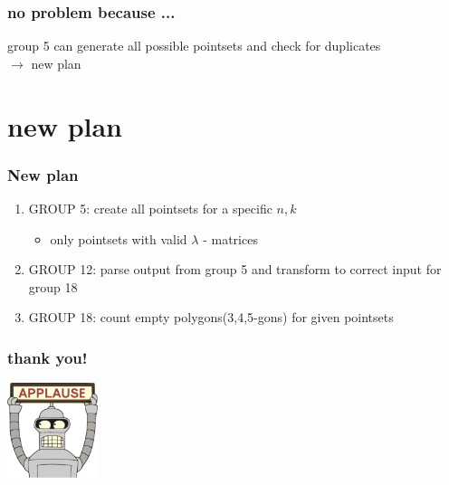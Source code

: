 \documentclass{beamer}
\begin{document}
\begin{frame}
\frametitle{no problem because ...}
group 5 can generate all possible pointsets and check for duplicates\\
$\rightarrow$ new plan
\end{frame}

\section{new plan}
\begin{frame}
\frametitle{New plan}
\begin{enumerate}
\item GROUP 5: create all pointsets for a specific $n,k$
  \begin{itemize}
  \item only pointsets with valid $\lambda$ - matrices
  \end{itemize}
\item GROUP 12: parse output from group 5 and transform to correct input for group 18
\item GROUP 18: count empty polygons(3,4,5-gons) for given pointsets



\end{enumerate}
\end{frame}






\begin{frame}
\frametitle{thank you!}
\begin{center}
\vspace{2em}
\includegraphics[width=100px]{bender}
\end{center}
\end{frame}
\end{document}
